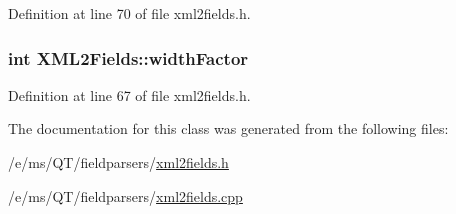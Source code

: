 Definition at line 70 of file xml2fields.h.

\hypertarget{classXML2Fields_a66a1337c8ec02921c2ba3a9b24d5e12e}{
\subsubsection[{widthFactor}]{\setlength{\rightskip}{0pt plus 5cm}int {\bf XML2Fields::widthFactor}}}
\label{classXML2Fields_a66a1337c8ec02921c2ba3a9b24d5e12e}


Definition at line 67 of file xml2fields.h.



The documentation for this class was generated from the following files:\begin{DoxyCompactItemize}
\item 
/e/ms/QT/fieldparsers/\hyperlink{xml2fields_8h}{xml2fields.h}\item 
/e/ms/QT/fieldparsers/\hyperlink{xml2fields_8cpp}{xml2fields.cpp}\end{DoxyCompactItemize}
